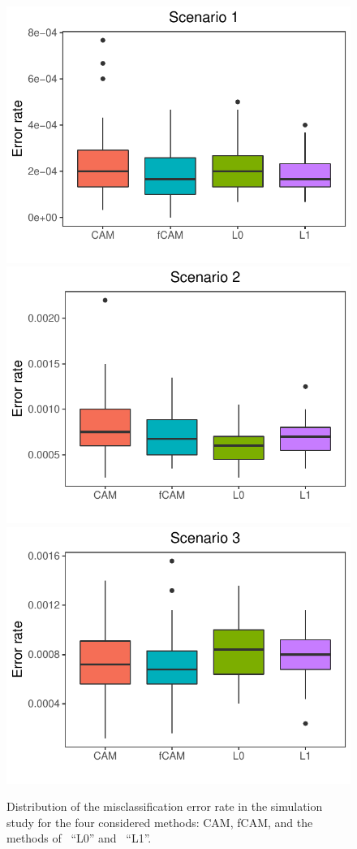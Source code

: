 %
%
\begin{figure}
	\centering
	\includegraphics[width = .6\textwidth]{_Images/ch3_Figure_1.pdf}
	\includegraphics[width = .6\textwidth]{_Images/ch3_Figure_2.pdf}
	\includegraphics[width = .6\textwidth]{_Images/ch3_Figure_3.pdf}
	\caption[Comparison between the misclassification error rate in the simulation study for the four considered methods.]{Distribution of the misclassification error rate in the simulation study for the four considered methods: CAM, fCAM, and the methods of~\textcite{jewell2019} ``L0'' and~\textcite{friedrich2017} ``L1''.}
	\label{fig:boxplots_rates}
\end{figure}





